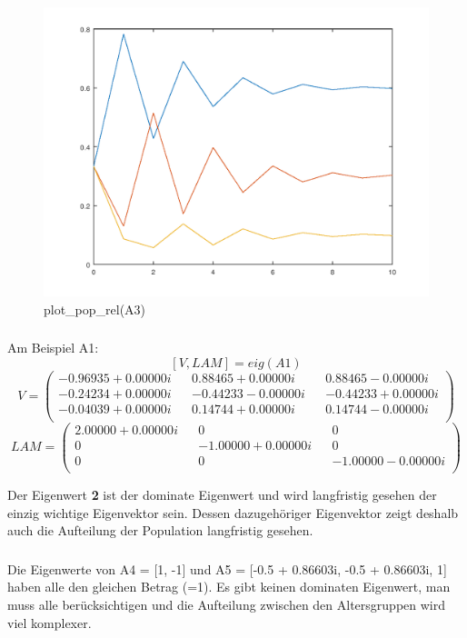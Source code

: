 \documentclass{article}
\begin{document}
\begin{figure}[H]
\centering
\includegraphics[scale=0.5]{plotrelA3.png}
\caption{plot\_pop\_rel(A3)}
\label{fig:universe}
\end{figure}

\subsubsection{}
Am Beispiel A1: \\
$$[V, LAM] = eig(A1)$$
\[
V =
  \begin{pmatrix}
    -0.96935 + 0.00000i && 0.88465 + 0.00000i && 0.88465 - 0.00000i \\ 
    -0.24234 + 0.00000i && -0.44233 - 0.00000i && -0.44233 + 0.00000i \\
    -0.04039 + 0.00000i &&  0.14744 + 0.00000i && 0.14744 - 0.00000i \\
  \end{pmatrix}
\]
\[
LAM =
  \begin{pmatrix}
    2.00000 + 0.00000i && 0 && 0 \\ 
    0 && -1.00000 + 0.00000i && 0 \\
    0 &&  0 &&  -1.00000 - 0.00000i \\
  \end{pmatrix}
\]

Der Eigenwert \textbf{2} ist der dominate Eigenwert und wird langfristig gesehen der einzig wichtige Eigenvektor sein. Dessen dazugehöriger Eigenvektor zeigt deshalb auch die Aufteilung der Population langfristig gesehen.

\subsubsection{}
Die Eigenwerte von A4 = [1, -1] und A5 = [-0.5 + 0.86603i, -0.5 + 0.86603i, 1] haben alle den gleichen Betrag (=1). Es gibt keinen dominaten Eigenwert, man muss alle berücksichtigen und die Aufteilung zwischen den Altersgruppen wird viel komplexer.
\end{document}
